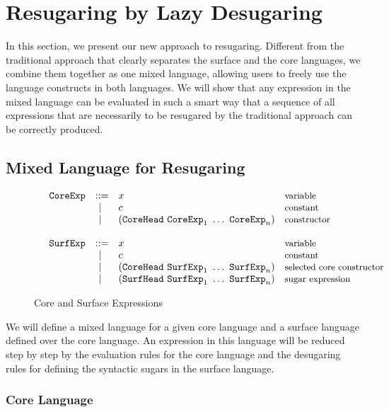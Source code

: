 
\section{Resugaring by Lazy Desugaring}
\label{sec3}

In this section, we present our new approach to resugaring. Different from the traditional approach that clearly separates the surface and the core languages, we combine them together as one mixed language, allowing users to freely use the language constructs in both languages. We will show that any expression in the mixed language can be evaluated in such a smart way that a sequence of all expressions that are necessarily to be resugared by the traditional approach can be correctly produced.

\subsection{Mixed Language for Resugaring}

\begin{figure}[thb]
	\[
	\begin{array}{lllll}
	 &\mbox{\tt CoreExp} &::=& x  & \mbox{{\small variable}}\\
	       &&~|~& c  & \mbox{{\small constant}}\\
				 &&~|~& (\mbox{\tt CoreHead}~\mbox{\tt CoreExp}_1~\ldots~\mbox{\tt CoreExp}_n) & \mbox{{\small constructor}}\\
	\\
	 &\mbox{\tt SurfExp} &::=& x  & \mbox{{\small variable}}\\
	       &&~|~& c  & \mbox{{\small constant}}\\
				  &&~|~& (\mbox{\tt CoreHead}~\mbox{\tt SurfExp}_1~\ldots~\mbox{\tt SurfExp}_n) & \mbox{{\small selected core constructor}}\\
					 &&~|~& (\mbox{\tt SurfHead}~\mbox{\tt SurfExp}_1~\ldots~\mbox{\tt SurfExp}_n) & \mbox{{\small sugar expression}}\\
	\end{array}
	\]
	\caption{Core and Surface Expressions}
	\label{fig:expression}
\end{figure}

We will define a mixed language for a given core language and a surface language defined over the core language. An expression in this language will be reduced step by step by the evaluation rules for the core language and the desugaring rules for defining the syntactic sugars in the surface language.

\subsubsection{Core Language}

